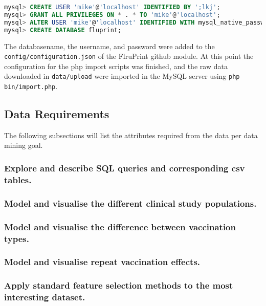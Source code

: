 \begin{lstlisting}[language=sql, caption=Adding user and database to sql server, label={lst:addUser}]
mysql> CREATE USER 'mike'@'localhost' IDENTIFIED BY ';lkj';
mysql> GRANT ALL PRIVILEGES ON * . * TO 'mike'@'localhost';
mysql> ALTER USER 'mike'@'localhost' IDENTIFIED WITH mysql_native_password BY 'mike';
mysql> CREATE DATABASE fluprint;
\end{lstlisting}

The databasename, the username, and password were added to the
\lstinline{config/configuration.json} of the FlruPrint github module. At this
point the configuration for the php import scripts was finished, and the raw
data downloaded in \lstinline{data/upload} were imported in the MySQL server
using \lstinline{php bin/import.php}.

\subsection{Data Requirements}

The following subsections will list the attributes required from the data per
data mining goal.

\subsubsection{Explore and describe SQL queries and corresponding csv tables.}

\subsubsection{Model and visualise the different clinical study populations.}

\subsubsection{Model and visualise the difference between vaccination types.}

\subsubsection{Model and visualise repeat vaccination effects.}

\subsubsection{Apply standard feature selection methods to the most interesting dataset.}

